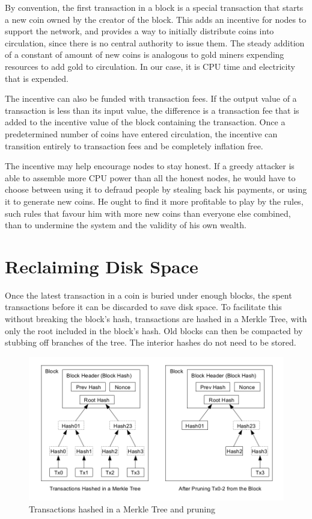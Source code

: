 By convention, the first transaction in a block is a special transaction that starts a new coin owned by the creator of the block. This adds an incentive for nodes to support the network, and provides a way to initially distribute coins into circulation, since there is no central authority to issue them. The steady addition of a constant of amount of new coins is analogous to gold miners expending resources to add gold to circulation. In our case, it is CPU time and electricity that is expended.

The incentive can also be funded with transaction fees. If the output value of a transaction is less than its input value, the difference is a transaction fee that is added to the incentive value of the block containing the transaction. Once a predetermined number of coins have entered circulation, the incentive can transition entirely to transaction fees and be completely inflation free.

The incentive may help encourage nodes to stay honest. If a greedy attacker is able to assemble more CPU power than all the honest nodes, he would have to choose between using it to defraud people by stealing back his payments, or using it to generate new coins. He ought to find it more profitable to play by the rules, such rules that favour him with more new coins than everyone else combined, than to undermine the system and the validity of his own wealth.

\section{Reclaiming Disk Space}

Once the latest transaction in a coin is buried under enough blocks, the spent transactions before it can be discarded to save disk space. To facilitate this without breaking the block's hash, transactions are hashed in a Merkle Tree, with only the root included in the block's hash. Old blocks can then be compacted by stubbing off branches of the tree. The interior hashes do not need to be stored.

\begin{figure}[ht!]
\centering
\includegraphics[trim = 0mm 0mm 0mm 0mm, width=120mm]{merkle_tree_and_pruning}
\caption{Transactions hashed in a Merkle Tree and pruning}
\end{figure}

